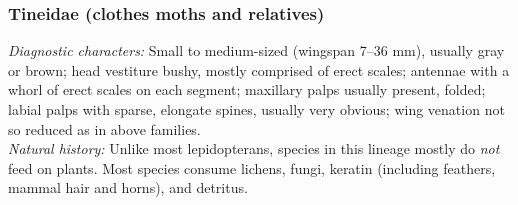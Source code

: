 \documentclass[letterpaper, 11pt]{article}
\begin{document}
\subsubsection{Tineidae (clothes moths and relatives)}
\noindent{}\textit{Diagnostic characters:} Small to medium-sized (wingspan 7--36 mm), usually gray or brown; head vestiture bushy, mostly comprised of erect scales; antennae with a whorl of erect scales on each segment; maxillary palps usually present, folded; labial palps with sparse, elongate spines, usually very obvious; wing venation not so reduced as in above families.\\

\noindent{}\textit{Natural history:} Unlike most lepidopterans, species in this lineage mostly do \textit{not} feed on plants. Most species consume lichens, fungi, keratin (including feathers, mammal hair and horns), and detritus.\\
\end{document}
